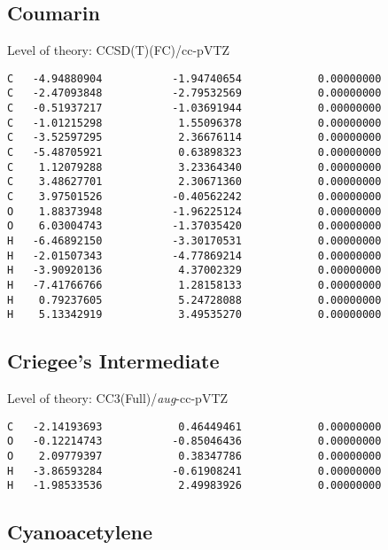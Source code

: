 \documentclass[journal=jctcce,manuscript=article,layout=traditional]{achemso}
\newcommand{\TZ}{cc-pVTZ}
\newcommand{\AVTZ}{\emph{aug}-cc-pVTZ}
\begin{document}
\subsection*{Coumarin}

\begin{singlespace}
Level of theory: CCSD(T)(FC)/{\TZ}
\begin{verbatim}
C   -4.94880904           -1.94740654            0.00000000
C   -2.47093848           -2.79532569            0.00000000
C   -0.51937217           -1.03691944            0.00000000
C   -1.01215298            1.55096378            0.00000000
C   -3.52597295            2.36676114            0.00000000
C   -5.48705921            0.63898323            0.00000000
C    1.12079288            3.23364340            0.00000000
C    3.48627701            2.30671360            0.00000000
C    3.97501526           -0.40562242            0.00000000
O    1.88373948           -1.96225124            0.00000000 
O    6.03004743           -1.37035420            0.00000000 
H   -6.46892150           -3.30170531            0.00000000
H   -2.01507343           -4.77869214            0.00000000
H   -3.90920136            4.37002329            0.00000000
H   -7.41766766            1.28158133            0.00000000
H    0.79237605            5.24728088            0.00000000
H    5.13342919            3.49535270            0.00000000
\end{verbatim}
\end{singlespace}

\subsection*{Criegee's Intermediate}

\begin{singlespace}
Level of theory: CC3(Full)/{\AVTZ}
\begin{verbatim}
C   -2.14193693            0.46449461            0.00000000
O   -0.12214743           -0.85046436            0.00000000
O    2.09779397            0.38347786            0.00000000
H   -3.86593284           -0.61908241            0.00000000
H   -1.98533536            2.49983926            0.00000000
\end{verbatim}
\end{singlespace}



\subsection*{Cyanoacetylene}
\end{document}

